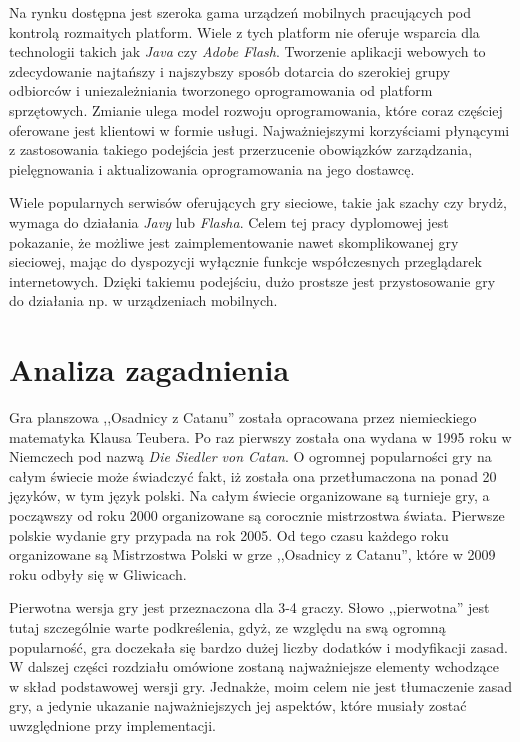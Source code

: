 \documentclass[11pt,twoside]{report}
\begin{document}
Na rynku dostępna jest szeroka gama urządzeń mobilnych pracujących pod
kontrolą rozmaitych platform. Wiele z tych platform nie oferuje
wsparcia dla technologii takich jak \emph{Java} czy \emph{Adobe
  Flash}. Tworzenie aplikacji webowych to zdecydowanie najtańszy i
najszybszy sposób dotarcia do szerokiej grupy odbiorców i
uniezależniania tworzonego oprogramowania od platform
sprzętowych. Zmianie ulega model rozwoju oprogramowania, które coraz
częściej oferowane jest klientowi w formie usługi. Najważniejszymi
korzyściami płynącymi z zastosowania takiego podejścia jest
przerzucenie obowiązków zarządzania, pielęgnowania i aktualizowania
oprogramowania na jego dostawcę.

Wiele popularnych serwisów oferujących gry sieciowe, takie jak szachy
czy brydż, wymaga do działania \emph{Javy} lub \emph{Flasha}. Celem
tej pracy dyplomowej jest pokazanie, że możliwe jest zaimplementowanie
nawet skomplikowanej gry sieciowej, mając do dyspozycji wyłącznie
funkcje współczesnych przeglądarek internetowych. Dzięki takiemu
podejściu, dużo prostsze jest przystosowanie gry do działania np. w
urządzeniach mobilnych.

\cleardoublepage

\chapter{Analiza zagadnienia}
Gra planszowa ,,Osadnicy z Catanu'' została opracowana przez
niemieckiego matematyka Klausa Teubera. Po raz pierwszy została ona
wydana w 1995 roku w Niemczech pod nazwą \emph{Die Siedler von
  Catan}. O ogromnej popularności gry na całym świecie może świadczyć
fakt, iż została ona przetłumaczona na ponad 20 języków, w tym język
polski. Na całym świecie organizowane są turnieje gry, a począwszy od
roku 2000 organizowane są corocznie mistrzostwa świata. Pierwsze
polskie wydanie gry przypada na rok 2005. Od tego czasu każdego roku
organizowane są Mistrzostwa Polski w grze ,,Osadnicy z Catanu'', które
w 2009 roku odbyły się w Gliwicach\cite{pionek}.

Pierwotna wersja gry jest przeznaczona dla 3-4 graczy. Słowo
,,pierwotna'' jest tutaj szczególnie warte podkreślenia, gdyż, ze
względu na swą ogromną popularność, gra doczekała się bardzo dużej
liczby dodatków i modyfikacji zasad. W dalszej części rozdziału
omówione zostaną najważniejsze elementy wchodzące w skład podstawowej
wersji gry. Jednakże, moim celem nie jest tłumaczenie zasad gry, a
jedynie ukazanie najważniejszych jej aspektów, które musiały zostać
uwzględnione przy implementacji.
\end{document}
